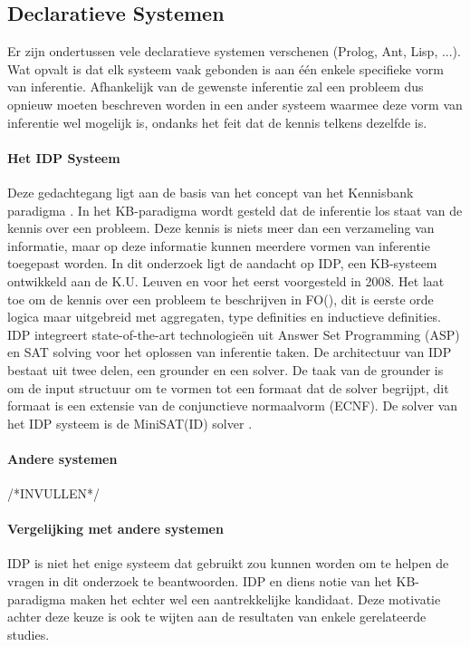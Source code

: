 \subsection{Declaratieve Systemen}
Er zijn ondertussen vele declaratieve systemen verschenen (Prolog, Ant, Lisp, ...). Wat opvalt is dat elk systeem vaak gebonden is aan \'{e}\'{e}n enkele specifieke vorm van inferentie. Afhankelijk van de gewenste inferentie zal een probleem dus opnieuw moeten beschreven worden in een ander systeem waarmee deze vorm van inferentie wel mogelijk is, ondanks het feit dat de kennis telkens dezelfde is. 

\paragraph{Het IDP Systeem}
Deze gedachtegang ligt aan de basis van het concept van het Kennisbank paradigma \citep{denecker2008building}. In het KB-paradigma wordt gesteld dat de inferentie los staat van de kennis over een probleem. Deze kennis is niets meer dan een verzameling van informatie, maar op deze informatie kunnen meerdere vormen van inferentie toegepast worden. In dit onderzoek ligt de aandacht op IDP, een KB-systeem ontwikkeld aan de K.U. Leuven en voor het eerst voorgesteld in 2008. Het laat toe om de kennis over een probleem te beschrijven in FO(\textperiodcentered), dit is eerste orde logica maar uitgebreid met aggregaten, type definities en inductieve definities. IDP integreert state-of-the-art technologie\"{e}n uit Answer Set Programming (ASP) en SAT solving voor het oplossen van inferentie taken. De architectuur van IDP bestaat uit twee delen, een grounder en een solver. De taak van de grounder is om de input structuur om te vormen tot een formaat dat de solver begrijpt, dit formaat is een extensie van de conjunctieve normaalvorm (ECNF). De solver van het IDP systeem is de MiniSAT(ID) solver \citep{de2014minisat}.

\paragraph{Andere systemen}
/*INVULLEN*/

\paragraph{Vergelijking met andere systemen}
IDP is niet het enige systeem dat gebruikt zou kunnen worden om te helpen de vragen in dit onderzoek te beantwoorden. IDP en diens notie van het KB-paradigma maken het echter wel een aantrekkelijke kandidaat. Deze motivatie achter deze keuze is ook te wijten aan de resultaten van enkele gerelateerde studies. 

